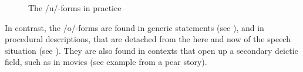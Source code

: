 \begin{figure}
\centering
\setlength{\fboxsep}{0pt}
\caption{The /u/-forms in practice}\label{deixill-1}
\end{figure}


	
\largerpage
In contrast, the /o/-forms are found in generic statements (see \Next[a]), and in procedural descriptions, that are detached from the here and now of the speech situation (see \Next[c]). They are also found in contexts that open up a secondary deictic field, such as in movies (see example  \Next[b] from a pear story). 

